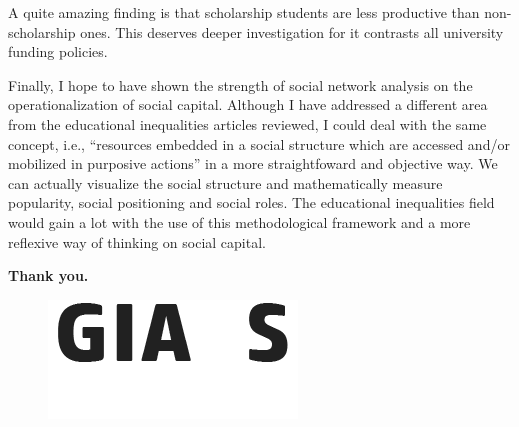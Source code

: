 \documentclass[compress]{beamer}
\begin{document}
\begin{frame}
	\justify
	
	A quite amazing finding is that scholarship students are less productive than non-scholarship ones. This deserves deeper investigation for it contrasts all university funding policies.

	\vspace{3mm}
	
	Finally, I hope to have shown the strength of social network analysis on the operationalization of social capital. Although I have addressed a different area from the educational inequalities articles reviewed, I could deal with the same concept, i.e., ``resources embedded in a social structure which are accessed and/or mobilized in purposive actions'' \cite[p. 35]{lin1999building} in a more straightfoward and objective way. We can actually visualize the social structure and mathematically measure popularity, social positioning and social roles. The educational inequalities field would gain a lot with the use of this methodological framework and a more reflexive way of thinking on social capital.
\end{frame}



\begin{frame}

\begin{center}
\vspace{14mm}
\color{white}\sffamily
{\bfseries\LARGE Thank you.\par} %
\vspace{6mm}
\end{center}
\begin{center}
	\begin{figure}
    \includegraphics[scale=0.3, valign=t]{GIARS_logo2.png}
    \end{figure}
   \vfill
\end{center}


\end{frame}



\end{document}
